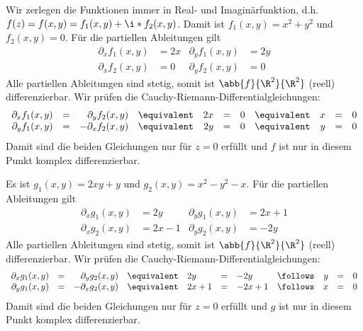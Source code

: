 \begin{exercisePage}
Wir zerlegen die Funktionen immer in Real- und Imaginärfunktion, d.h. $f(z) = f(x,y) = f_1(x,y) + \i * f_2(x,y)$. Damit ist $f_1(x,y) = x^2 + y^2$ und $f_2(x,y) = 0$. Für die partiellen Ableitungen gilt
\begin{align*}
	\partial_x f_1(x,y)  &= 2x 	&	\partial_y f_1(x,y) &= 2y \\
	\partial_x f_2(x,y)  &= 0 	&	\partial_y f_2(x,y) &= 0
\end{align*}
Alle partiellen Ableitungen sind stetig, somit ist $\abb{f}{\R^2}{\R^2}$ (reell) differenzierbar. Wir prüfen die Cauchy-Riemann-Differentialgleichungen:
\begin{equation*}
	\begin{array}{rcrcrcrcrcr}
	\partial_x f_1(x,y) &=& \partial_y f_2(x,y) &\equivalent& 2x &=& 0 &\equivalent& x &=& 0 \\
	\partial_y f_1(x,y) &=& - \partial_x f_2(x,y)  &\equivalent& 2y &=& 0 &\equivalent& y &=& 0 
	\end{array}
\end{equation*}
Damit sind die beiden Gleichungen nur für $z = 0$ erfüllt und $f$ ist nur in diesem Punkt komplex differenzierbar.

Es ist $g_1(x,y) = 2xy + y$ und $g_2(x,y) = x^2 - y^2 - x$. Für die partiellen Ableitungen gilt
\begin{align*}
	\partial_x g_1(x,y)  &= 2y 		&	\partial_y g_1(x,y) &= 2x+1 \\
	\partial_x g_2(x,y)  &= 2x-1	&	\partial_y g_2(x,y) &= -2y
\end{align*}
Alle partiellen Ableitungen sind stetig, somit ist $\abb{f}{\R^2}{\R^2}$ (reell) differenzierbar. Wir prüfen die Cauchy-Riemann-Differentialgleichungen:
\begin{equation*}
\begin{array}{rcrclclcrcr}
	\partial_x g_1(x,y) &=& \partial_y g_2(x,y) &\equivalent& 2y &=& -2y &\follows& y &=& 0 \\
	\partial_y g_1(x,y) &=& - \partial_x g_2(x,y)  &\equivalent& 2x+1 &=& -2x+1 &\follows& x &=& 0 
\end{array}
\end{equation*}
Damit sind die beiden Gleichungen nur für $z = 0$ erfüllt und $g$ ist nur in diesem Punkt komplex differenzierbar.


\end{exercisePage}
